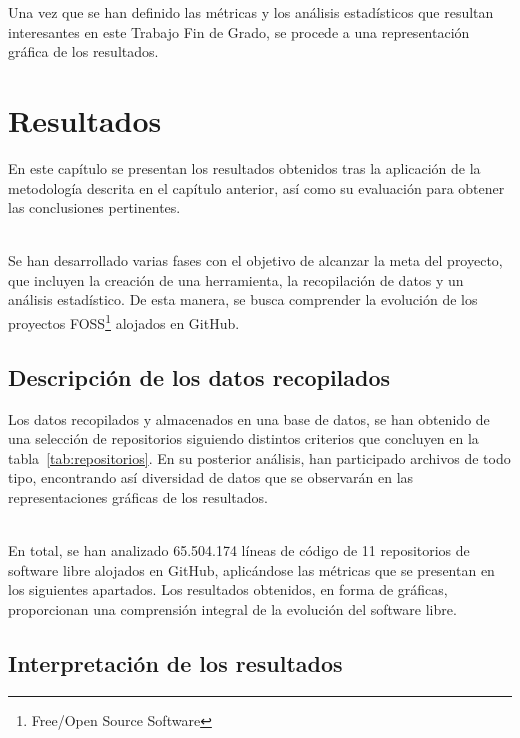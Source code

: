 \documentclass[a4paper, 12pt]{book}
\begin{document}
Una vez que se han definido las métricas y los análisis estadísticos que resultan interesantes en este Trabajo Fin de Grado, se procede a una representación gráfica
de los resultados.



\cleardoublepage
\chapter{Resultados}
\label{chap:resultados}

En este capítulo se presentan los resultados obtenidos tras la aplicación de la metodología descrita en el capítulo anterior, así como su evaluación para obtener las
conclusiones pertinentes.

\\Se han desarrollado varias fases con el objetivo de alcanzar la meta del proyecto, que incluyen la creación de una herramienta, la recopilación de datos y un análisis
estadístico. De esta manera, se busca comprender la evolución de los proyectos FOSS\footnote{Free/Open Source Software} alojados en GitHub.

\section{Descripción de los datos recopilados} 
\label{sec:datos-recopilados}

Los datos recopilados y almacenados en una base de datos, se han obtenido de una selección de repositorios siguiendo distintos criterios que concluyen en la tabla~\ref{tab:repositorios}.
En su posterior análisis, han participado archivos de todo tipo, encontrando así diversidad de datos que se observarán en las representaciones gráficas de los resultados.

\\En total, se han analizado 65.504.174 líneas de código de 11 repositorios de software libre alojados en GitHub, aplicándose las métricas que se presentan en los siguientes apartados.
Los resultados obtenidos, en forma de gráficas, proporcionan una comprensión integral de la evolución del software libre.

\section{Interpretación de los resultados} 
\label{sec:interpretación-resultados}
\end{document}
